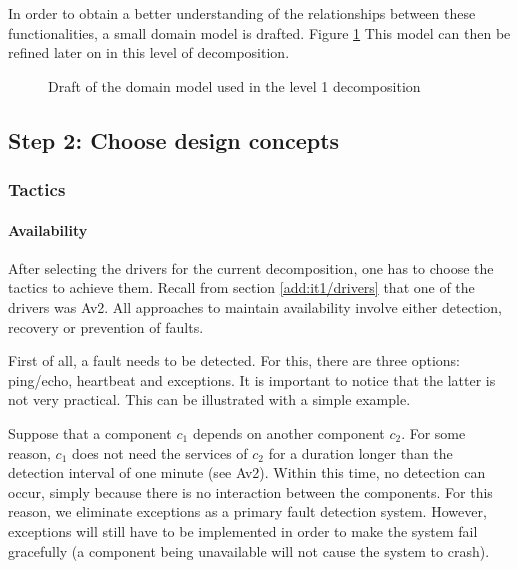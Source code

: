 \npar In order to obtain a better understanding of the relationships between
these functionalities, a small domain model is drafted. Figure
\ref{fig:add/it1/draft} This model can then be refined later on
in this level of decomposition.

\begin{figure}[H]
	\begin{centering}
		\caption{Draft of the domain model used in the level 1 decomposition}
		\label{fig:add/it1/draft}
	\end{centering}
\end{figure}

\subsection{Step 2: Choose design concepts}
\label{add:it1/concepts}

\subsubsection{Tactics}
\label{add:it1/tactics}

\paragraph{Availability}
 
\npar After selecting the drivers for the current decomposition, one has to
choose the tactics to achieve them. Recall from section \ref{add:it1/drivers}
that one of the drivers was Av2. All approaches to maintain availability
involve either detection, recovery or prevention of faults.

\npar First of all, a fault needs to be detected. For this, there are three
options: ping/echo, heartbeat and exceptions. It is important to notice that the
latter is not very practical. This can be illustrated with a simple example.

\npar Suppose that a component $c_1$ depends on another component $c_2$. For
some reason, $c_1$ does not need the services of $c_2$ for a duration longer
than the detection interval of one minute (see Av2). Within this time,
no detection can occur, simply because there is no interaction between the
components. For this reason, we eliminate exceptions as a primary fault
detection system. However, exceptions will still have to be implemented in order
to make the system fail gracefully (a component being unavailable will not
cause the system to crash).

